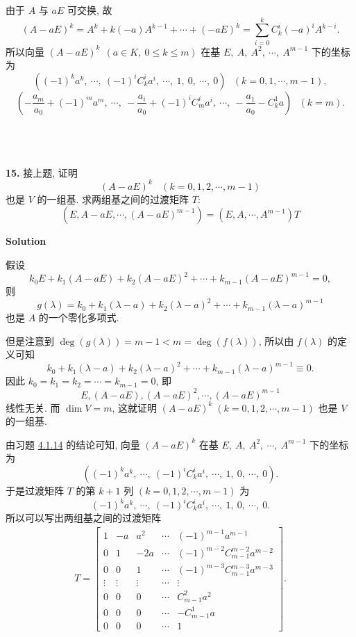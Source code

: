 \documentclass[11pt,a4paper,openany,oneside]{book}
\newcommand\Solution{\noindent\textbf{\textsf{Solution}}\par\medskip}
\begin{document}
由于 $ A $ 与 $ aE $ 可交换, 故
 $$  (A - aE)^k = A^k + k(-a)A^{k-1} + \cdots + (-aE)^k = \sum\limits_{i=0}^k C_k^i(-a)^{i}A^{k-i}.$$ 
所以向量  $ (A - aE)^k\ \ (a \in K, \ 0 \leq k \leq m) $  在基 $  E,\ A,\ A^2,\ \cdots,\ A^{m-1}   $ 下的坐标为
 $$ \left((-1)^ka^k,\ \cdots,\ (-1)^{i}C_k^ia^{i},\ \cdots,\ 1,\ 0,\ \cdots,\ 0 \right) \ \ \ (k = 0, 1, \cdots, m-1), $$ 
 $$ \left(-\dfrac{a_m}{a_0}+(-1)^ma^m,\ \cdots,\ -\dfrac{a_i}{a_0}+(-1)^{i}C_m^ia^{i},\ \cdots,\ -\dfrac{a_1}{a_0} - C_k^1a  \right) \ \ \ (k = m). $$   \\ \\ \\


\begin{myexample}
	\textbf{15.} 
接上题, 证明
 $$  (A - aE)^k \ \ \ \ (k =0, 1, 2, \cdots, m-1 ) $$ 
也是 $ V $ 的一组基. 求两组基之间的过渡矩阵 $ T $: 
 $$  (E, A-aE, \cdots, (A-aE)^{m-1}) = (E, A, \cdots, A^{m-1})T  $$   
\end{myexample}
\Solution

假设
 $$  k_0E + k_1(A-aE) + k_2 (A-aE)^2 + \cdots + k_{m-1}(A-aE)^{m-1} = 0, $$ 
则 
 $$ g(\lambda) =k_0 + k_1(\lambda-a) + k_2(\lambda-a)^2 + \cdots + k_{m-1}(\lambda-a)^{m-1} $$ 
也是 $ A $ 的一个零化多项式.  

但是注意到 $ \deg(g(\lambda)) = m-1 < m = \deg(f(\lambda))$, 所以由 $ f(\lambda) $ 的定义可知
 $$  k_0 + k_1(\lambda-a) + k_2(\lambda-a)^2 + \cdots + k_{m-1}(\lambda-a)^{m-1} \equiv 0.$$ 
因此 $ k_0 = k_1 = k_2 = \cdots = k_{m-1} = 0 $, 即
\[
E, (A-aE), (A-aE)^2, \cdots, (A-aE)^{m-1}
\]
线性无关. 而 $ \dim V = m $, 这就证明 $(A - aE)^k\;(k =0, 1, 2, \cdots, m-1 )$  也是 $ V $ 的一组基.

由习题 \hyperlink{4.1.14}{4.1.14} 的结论可知, 向量 $ (A - aE)^k $ 在基 $  E,\ A,\ A^2,\ \cdots,\ A^{m-1}  $ 下的坐标为
$$ 
\left((-1)^ka^k,\ \cdots,\ (-1)^{i}C_k^ia^{i},\ \cdots,\ 1,\ 0,\ \cdots,\ 0 \right).  
$$ 
于是过渡矩阵 $ T $ 的第 $ k+1 $ 列 $ (k=0,1,2,\cdots, m-1) $ 为
$$  
(-1)^ka^k,\ \cdots,\ (-1)^{i}C_k^ia^{i},\ \cdots,\ 1,\ 0,\ \cdots,\ 0 . $$ 
所以可以写出两组基之间的过渡矩阵
\begin{gather*}
T = 
\begin{bmatrix}
1  &  -a  &  a^2 & \cdots & (-1)^{m-1}a^{m-1} \\
0  &   1  &  -2a & \cdots & (-1)^{m-2}C_{m-1}^{m-2}a^{m-2} \\
0  &   0  &  1   & \cdots & (-1)^{m-3}C_{m-1}^{m-3} a^{m-3} \\
\vdots & \vdots & \vdots & \cdots & \vdots  \\
0  &   0  &  0   &  \cdots &  C_{m-1}^2a^2 \\
0  &  0  &  0    &  \cdots  &  -C_{m-1}^{1}a  \\
0  &  0  &  0    &  \cdots  &  1  
\end{bmatrix}.
\end{gather*}  \\  \\  \\
\end{document}
